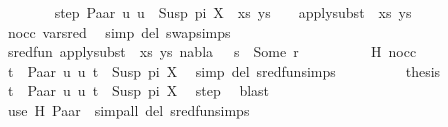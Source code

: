 \begin{isabellebody}
\ \ \ \ \ \ \isamarkupfalse%
\ step{\isacharcolon}{\kern0pt}\ {\isachardoublequoteopen}{\isacharparenleft}{\kern0pt}{\isacharparenleft}{\kern0pt}Paar\ u{}\ u{}\ {\isasymapprox}{\isacharquery}{\kern0pt}\ Susp\ pi\ X{\isacharparenright}{\kern0pt}\ {\isacharhash}{\kern0pt}\ xs{\isacharcomma}{\kern0pt}\ ys{\isacharparenright}{\kern0pt}\ {\isasymturnstile}\ {\isacharquery}{\kern0pt}{\isasymsigma}\ {\isasymleadsto}\ apply{\isacharunderscore}{\kern0pt}subst\ {\isacharquery}{\kern0pt}{\isasymsigma}\ {\isacharparenleft}{\kern0pt}xs{\isacharcomma}{\kern0pt}\ ys{\isacharparenright}{\kern0pt}{\isachardoublequoteclose}\isanewline
\ \ \ \ \ \ \ \ \isamarkupfalse%
\ nocc\ var{\isacharunderscore}{\kern0pt}{}{\isacharunderscore}{\kern0pt}sred\ \isamarkupfalse%
\ {\isacharparenleft}{\kern0pt}simp\ del{\isacharcolon}{\kern0pt}\ swap{\isachardot}{\kern0pt}simps{\isacharparenright}{\kern0pt}\isanewline
\ \ \ \ \ \ \isamarkupfalse%
\ {\isachardoublequoteopen}sred{\isacharunderscore}{\kern0pt}fun\ {\isacharparenleft}{\kern0pt}apply{\isacharunderscore}{\kern0pt}subst\ {\isacharquery}{\kern0pt}{\isasymsigma}\ {\isacharparenleft}{\kern0pt}xs{\isacharcomma}{\kern0pt}\ ys{\isacharparenright}{\kern0pt}{\isacharcomma}{\kern0pt}\ nabla{\isacharcomma}{\kern0pt}\ {\isacharquery}{\kern0pt}{\isasymsigma}\ {\isasymbullet}\ s{\isacharparenright}{\kern0pt}\ {\isacharequal}{\kern0pt}\ Some\ r{\isachardoublequoteclose}\isanewline
\ \ \ \ \ \ \ \ \isamarkupfalse%
\ H\ nocc\ \isamarkupfalse%
\ {\isacartoucheopen}t{}\ {\isacharequal}{\kern0pt}\ Paar\ u{}\ u{}{\isacartoucheclose}\ {\isacartoucheopen}t{}\ {\isacharequal}{\kern0pt}\ Susp\ pi\ X{\isacartoucheclose}\ \isamarkupfalse%
\ {\isacharparenleft}{\kern0pt}simp\ del{\isacharcolon}{\kern0pt}\ sred{\isacharunderscore}{\kern0pt}fun{\isachardot}{\kern0pt}simps{\isacharparenright}{\kern0pt}\isanewline
\ \ \ \ \ \ \isamarkupfalse%
\ \isamarkupfalse%
\ {\isacharquery}{\kern0pt}thesis\ \isamarkupfalse%
\ {\isacartoucheopen}t{}\ {\isacharequal}{\kern0pt}\ Paar\ u{}\ u{}{\isacartoucheclose}\ {\isacartoucheopen}t{}\ {\isacharequal}{\kern0pt}\ Susp\ pi\ X{\isacartoucheclose}\ \isamarkupfalse%
\ step\ \isamarkupfalse%
\ blast\isanewline
\ \ \ \ \isamarkupfalse%
\ {\isacharparenleft}{\kern0pt}use\ H\ Paar\ \ {\isacartoucheopen}simp{\isacharunderscore}{\kern0pt}all\ del{\isacharcolon}{\kern0pt}\ sred{\isacharunderscore}{\kern0pt}fun{\isachardot}{\kern0pt}simps{\isacartoucheclose}{\isacharparenright}{\kern0pt}\isanewline

\end{isabellebody}
